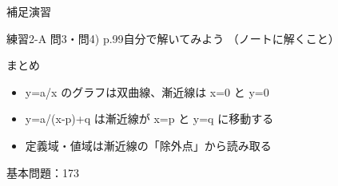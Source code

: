 \documentclass[aspectratio=43,professionalfonts,handout]{beamer}
\begin{document}
\begin{frame}{補足演習}
  \begin{block}{練習2-A 問3・問4) p.99\quad 自分で解いてみよう}
    （ノートに解くこと）
  \end{block}
\end{frame}

\begin{frame}{まとめ}
  \begin{itemize}
    \item y=a/x のグラフは双曲線、漸近線は x=0 と y=0
    \item y=a/(x-p)+q は漸近線が x=p と y=q に移動する
    \item 定義域・値域は漸近線の「除外点」から読み取る
  \end{itemize}

  \vfill
  {\small 基本問題：173}
\end{frame}
\end{document}
